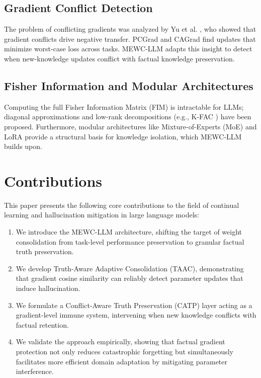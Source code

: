 \documentclass[10pt, conference, letterpaper]{IEEEtran}
\begin{document}
\subsection{Gradient Conflict Detection}
The problem of conflicting gradients was analyzed by Yu et al. \cite{yu2020gradient}, who showed that gradient conflicts drive negative transfer. PCGrad \cite{yu2020gradient} and CAGrad \cite{liu2021conflict} find updates that minimize worst-case loss across tasks. MEWC-LLM adapts this insight to detect when new-knowledge updates conflict with factual knowledge preservation.

\subsection{Fisher Information and Modular Architectures}
Computing the full Fisher Information Matrix (FIM) is intractable for LLMs; diagonal approximations and low-rank decompositions (e.g., K-FAC \cite{martens2015optimizing}) have been proposed. Furthermore, modular architectures like Mixture-of-Experts (MoE) \cite{shazeer2017outrageously} and LoRA \cite{hu2021lora} provide a structural basis for knowledge isolation, which MEWC-LLM builds upon.

\section{Contributions}

This paper presents the following core contributions to the field of continual learning and hallucination mitigation in large language models:

\begin{enumerate}
    \item We introduce the MEWC-LLM architecture, shifting the target of weight consolidation from task-level performance preservation to granular factual truth preservation.
    \item We develop Truth-Aware Adaptive Consolidation (TAAC), demonstrating that gradient cosine similarity can reliably detect parameter updates that induce hallucination.
    \item We formulate a Conflict-Aware Truth Preservation (CATP) layer acting as a gradient-level immune system, intervening when new knowledge conflicts with factual retention.
    \item We validate the approach empirically, showing that factual gradient protection not only reduces catastrophic forgetting but simultaneously facilitates more efficient domain adaptation by mitigating parameter interference.
\end{enumerate}
\end{document}
